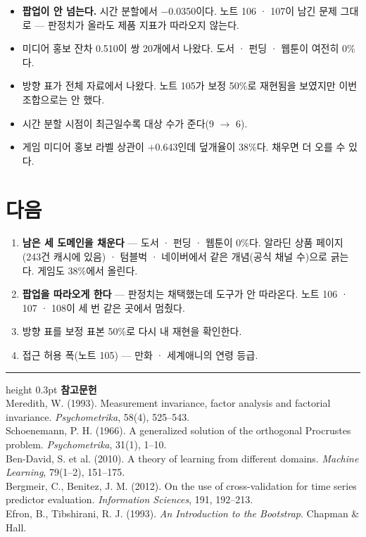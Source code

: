 \documentclass[10pt]{article}
\begin{document}
\begin{itemize}[leftmargin=1.1em,itemsep=0.15em]
\item \textbf{팝업이 안 넘는다.} 시간 분할에서 $-$0.0350이다. 노트 106 · 107이
      남긴 문제 그대로 --- 판정치가 올라도 제품 지표가 따라오지 않는다.
\item 미디어 홍보 잔차 0.510이 쌍 20개에서 나왔다. 도서 · 펀딩 · 웹툰이
      여전히 0\%다.
\item 방향 표가 전체 자료에서 나왔다. 노트 105가 보정 50\%로 재현됨을 보였지만
      이번 조합으로는 안 했다.
\item 시간 분할 시점이 최근일수록 대상 수가 준다(9 $\to$ 6).
\item 게임 미디어 홍보 라벨 상관이 $+$0.643인데 덮개율이 38\%다. 채우면
      더 오를 수 있다.
\end{itemize}

\section{다음}

\begin{enumerate}[leftmargin=1.3em,itemsep=0.15em]
\item \textbf{남은 세 도메인을 채운다} --- 도서 · 펀딩 · 웹툰이 0\%다. 알라딘
      상품 페이지(243건 캐시에 있음) · 텀블벅 · 네이버에서 같은 개념(공식
      채널 수)으로 긁는다. 게임도 38\%에서 올린다.
\item \textbf{팝업을 따라오게 한다} --- 판정치는 채택했는데 도구가 안 따라온다.
      노트 106 · 107 · 108이 세 번 같은 곳에서 멈췄다.
\item 방향 표를 보정 표본 50\%로 다시 내 재현을 확인한다.
\item 접근 허용 폭(노트 105) --- 만화 · 세계애니의 연령 등급.
\end{enumerate}

\vspace{0.6em}
\hrule height 0.3pt
\vspace{0.5em}
{\footnotesize
\textbf{참고문헌}\\[0.3em]
Meredith, W. (1993). Measurement invariance, factor analysis and factorial
invariance. \emph{Psychometrika}, 58(4), 525--543.\\[0.15em]
Schoenemann, P. H. (1966). A generalized solution of the orthogonal Procrustes
problem. \emph{Psychometrika}, 31(1), 1--10.\\[0.15em]
Ben-David, S. et al. (2010). A theory of learning from different domains.
\emph{Machine Learning}, 79(1--2), 151--175.\\[0.15em]
Bergmeir, C., Benitez, J. M. (2012). On the use of cross-validation for time
series predictor evaluation. \emph{Information Sciences}, 191, 192--213.\\[0.15em]
Efron, B., Tibshirani, R. J. (1993). \emph{An Introduction to the Bootstrap}.
Chapman \& Hall.
}
\end{document}
